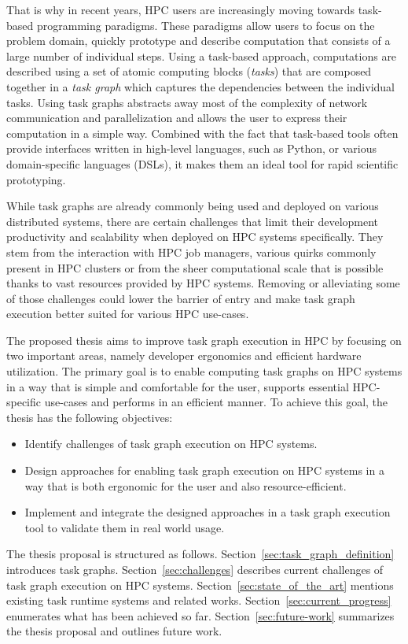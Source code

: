 That is why in recent years, HPC users are increasingly moving towards task-based programming
paradigms. These paradigms allow users to focus on the problem domain, quickly prototype and
describe computation that consists of a large number of individual steps. Using a task-based
approach, computations are described using a set of atomic computing blocks (\emph{tasks}) that
are composed together in a \emph{task graph} which captures the dependencies between the
individual tasks. Using task graphs abstracts away most of the complexity of network
communication and parallelization and allows the user to express their computation in a simple
way. Combined with the fact that task-based tools often provide interfaces written in high-level
languages, such as Python, or various domain-specific languages (DSLs), it makes them an ideal
tool for rapid scientific prototyping.

While task graphs are already commonly being used and deployed on various distributed systems,
there are certain challenges that limit their development productivity and scalability
when deployed on HPC systems specifically. They stem from the interaction with HPC job managers,
various quirks commonly present in HPC clusters or from the sheer computational scale that is
possible thanks to vast resources provided by HPC systems. Removing or alleviating some of those
challenges could lower the barrier of entry and make task graph execution better suited for
various HPC use-cases.

The proposed thesis aims to improve task graph execution in HPC by focusing on two important areas,
namely developer ergonomics and efficient hardware utilization. The primary goal is to enable
computing task graphs on HPC systems in a way that is simple and comfortable for the user, supports
essential HPC-specific use-cases and performs in an efficient manner. To achieve this goal, the
thesis has the following objectives:
\begin{itemize}
    \item Identify challenges of task graph execution on HPC systems.
    \item Design approaches for enabling task graph execution
    on HPC systems in a way that is both ergonomic for the user and also resource-efficient.
    \item Implement and integrate the designed approaches in a task graph execution tool to
    validate them in real world usage.
\end{itemize}

The thesis proposal is structured as follows. Section~\ref{sec:task_graph_definition} introduces
task graphs. Section~\ref{sec:challenges} describes current challenges of task graph execution on
HPC systems. Section~\ref{sec:state_of_the_art} mentions existing task runtime systems and
related works. Section~\ref{sec:current_progress} enumerates what has been achieved so far.
Section~\ref{sec:future-work} summarizes the thesis proposal and outlines future work.
